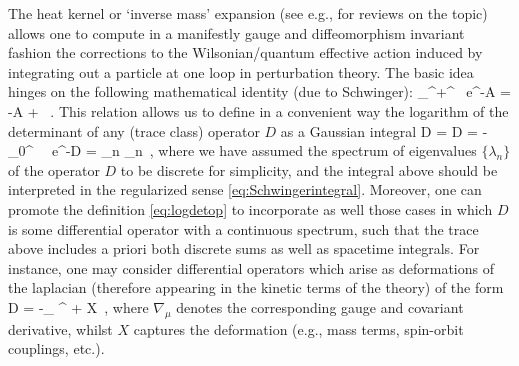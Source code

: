The heat kernel or `inverse mass' expansion (see e.g., \cite{Schubert:2001he,Vassilevich:2003xt} for reviews on the topic) allows one to compute in a manifestly gauge and diffeomorphism invariant fashion the corrections to the Wilsonian/quantum effective action induced by integrating out a particle at one loop in perturbation theory. The basic idea hinges on the following mathematical identity (due to Schwinger):
%
\beq\label{eq:Schwingerintegral}
\int_{\varepsilon {}^+}^{\infty} \frac{\dd \tau}{\tau}\, e^{-\tau A} = -\log A + \, .
\eeq
%
This relation allows us to define in a convenient way the logarithm of the determinant of any (trace class) operator $D$ as a Gaussian integral 
%
\beq\label{eq:logdetop}
\log \det D =  \log D = - \int_{0}^{\infty} \frac{\dd \tau}{\tau}\, \, e^{-\tau D} = \sum_n \log \lambda_n\, ,
\eeq
%
where we have assumed the spectrum of eigenvalues $\{ \lambda_n \}$ of the operator $D$ to be discrete for simplicity, and the integral above should be interpreted in the regularized sense \eqref{eq:Schwingerintegral}. Moreover, one can promote the definition \eqref{eq:logdetop} to incorporate as well those cases in which $D$ is some differential operator with a continuous spectrum, such that the trace above includes a priori both discrete sums as well as spacetime integrals. For instance, one may consider differential operators which arise as deformations of the laplacian (therefore appearing in the kinetic terms of the theory) of the form
%
\beq\label{eq:laplaciandeformation}
D = -\nabla_{\mu} \nabla^{\mu} + X\, ,
\eeq
%
where $\nabla_{\mu}$ denotes the corresponding gauge and covariant derivative, whilst $X$ captures the deformation (e.g., mass terms, spin-orbit couplings, etc.).

